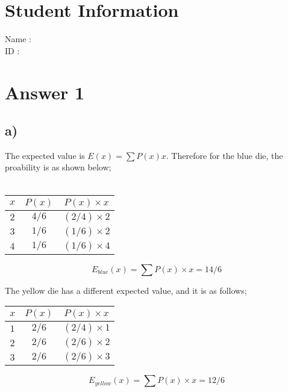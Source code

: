 \documentclass[12pt]{article}
\begin{document}
\section*{Student Information}

Name : \\

ID : \\


\section*{Answer 1}
\subsection*{a)}
The expected value is $E(x) = \sum P(x) x$. Therefore for the blue die, the proability is as shown below; \\ \\
\begin{center}
    \begin{tabular}{ c | c | c}
        $x$ & $P(x)$ & $P(x) \times x$ \\ 
        \hline
        $2$ & $4/6$ & $(2/4) \times 2$ \\
        $3$ & $1/6$ & $(1/6) \times 2$ \\
        $4$ & $1/6$ & $(1/6) \times 4$ \\
    \end{tabular}
\end{center}

\begin{equation}
    E_{blue}(x) = \sum P(x)\times x = 14/6
\end{equation}


The yellow die has a different expected value, and it is as follows;
\begin{center}
    \begin{tabular}{ c | c | c}
        $x$ & $P(x)$ & $P(x) \times x$ \\ 
        \hline
        $1$ & $2/6$ & $(2/4) \times 1$ \\
        $2$ & $2/6$ & $(2/6) \times 2$ \\
        $3$ & $2/6$ & $(2/6) \times 3$ \\
    \end{tabular}
\end{center}

\begin{equation}
    E_{yellow}(x) = \sum P(x)\times x = 12/6
\end{equation}
\end{document}
